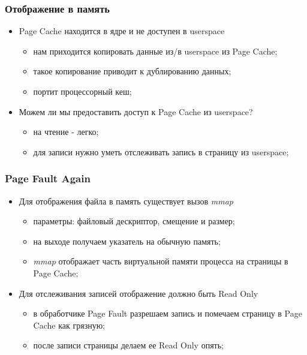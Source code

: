 \begin{frame}
\frametitle{Отображение в память}
\begin{itemize}
  \item<1-> Page Cache находится в ядре и не доступен в userspace
    \begin{itemize}
      \item нам приходится копировать данные из/в userspace из
            Page Cache;
      \item такое копирование приводит к дублированию данных;
      \item портит процессорный кеш;
    \end{itemize}
  \item<2-> Можем ли мы предоставить доступ к Page Cache из
            userspace?
    \begin{itemize}
      \item на чтение - легко;
      \item для записи нужно уметь отслеживать запись в страницу
            из userspace;
    \end{itemize}
\end{itemize}
\end{frame}

\begin{frame}
\frametitle{Page Fault Again}
\begin{itemize}
  \item<1-> Для отображения файла в память существует вызов \emph{mmap}
    \begin{itemize}
      \item параметры: файловый дескриптор, смещение и размер;
      \item на выходе получаем указатель на обычную память;
      \item \emph{mmap} отображает часть виртуальной памяти
            процесса на страницы в Page Cache;
    \end{itemize}
  \item<2-> Для отслеживания записей отображение должно быть Read Only
    \begin{itemize}
      \item в обработчике Page Fault разрешаем запись и помечаем страницу
            в Page Cache как грязную;
      \item после записи страницы делаем ее Read Only опять;
    \end{itemize}
\end{itemize}
\end{frame}
